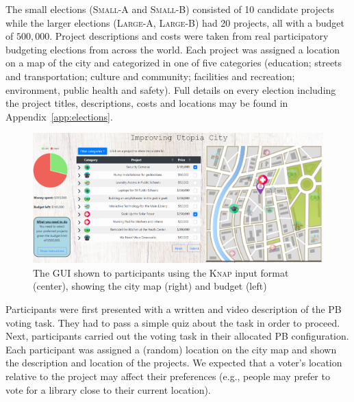 \documentclass{comsoc2023}
\newcommand{\knap}{\textsc{Knap}}
\begin{document}
The small elections (\textsc{Small-A} and  \textsc{Small-B}) consisted of 10 candidate projects while the larger elections  (\textsc{Large-A},  \textsc{Large-B}) had 20 projects, all with a budget of $500,000$.
Project descriptions and costs were taken from real participatory budgeting elections from across the world.   %
Each project was assigned a location on a map of the  city  and categorized in one of five  categories   (education; streets and transportation; culture and community; facilities and recreation; environment, public health and safety). 
Full  details  on every election including the project titles, descriptions,  costs and locations may be found in Appendix~\ref{app:elections}.

 \begin{figure}[h]
\begin{center}
\includegraphics[clip, trim=0 3mm 0 0, width=13cm]{experiment/full system.PNG}
\caption{The GUI shown to participants using the \knap{}  input format (center), showing  the city map (right) and budget (left)
}\label{fig:interface}
\end{center}
\end{figure}


 
Participants were first presented with a written and video description of the PB voting task. They had to pass a simple quiz about the task in order to proceed. 
Next, participants carried out the voting task 
in their allocated PB configuration.
Each participant was assigned a  (random) location on the city map and   shown the description and location of the projects. 
We expected that a voter's location relative to  the project may affect their   preferences (e.g., people may prefer to vote for a library  close to their current location). 
  
\end{document}
